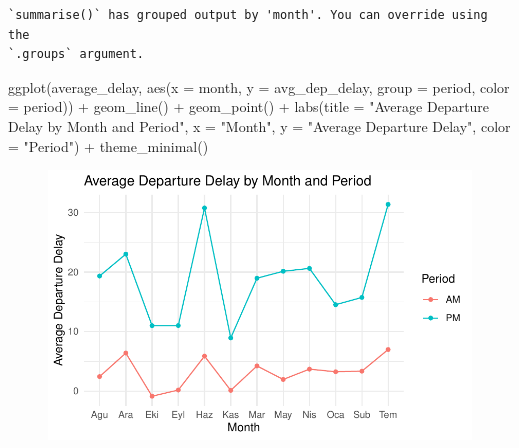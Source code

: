 \documentclass[
  letterpaper,
  DIV=11,
  numbers=noendperiod]{scrartcl}
\newenvironment{Shaded}{\begin{snugshade}}{\end{snugshade}}
\newcommand{\AttributeTok}[1]{\textcolor[rgb]{0.40,0.45,0.13}{#1}}
\newcommand{\FunctionTok}[1]{\textcolor[rgb]{0.28,0.35,0.67}{#1}}
\newcommand{\NormalTok}[1]{\textcolor[rgb]{0.00,0.23,0.31}{#1}}
\newcommand{\SpecialCharTok}[1]{\textcolor[rgb]{0.37,0.37,0.37}{#1}}
\newcommand{\StringTok}[1]{\textcolor[rgb]{0.13,0.47,0.30}{#1}}
\begin{document}
\begin{verbatim}
`summarise()` has grouped output by 'month'. You can override using the
`.groups` argument.
\end{verbatim}

\begin{Shaded}
\begin{Highlighting}[]
\FunctionTok{ggplot}\NormalTok{(average\_delay, }\FunctionTok{aes}\NormalTok{(}\AttributeTok{x =}\NormalTok{ month, }\AttributeTok{y =}\NormalTok{ avg\_dep\_delay, }\AttributeTok{group =}\NormalTok{ period, }\AttributeTok{color =}\NormalTok{ period)) }\SpecialCharTok{+}
  \FunctionTok{geom\_line}\NormalTok{() }\SpecialCharTok{+}
  \FunctionTok{geom\_point}\NormalTok{() }\SpecialCharTok{+}
  \FunctionTok{labs}\NormalTok{(}\AttributeTok{title =} \StringTok{"Average Departure Delay by Month and Period"}\NormalTok{,}
       \AttributeTok{x =} \StringTok{"Month"}\NormalTok{,}
       \AttributeTok{y =} \StringTok{"Average Departure Delay"}\NormalTok{,}
       \AttributeTok{color =} \StringTok{"Period"}\NormalTok{) }\SpecialCharTok{+}
  \FunctionTok{theme\_minimal}\NormalTok{() }
\end{Highlighting}
\end{Shaded}

\begin{figure}[H]

{\centering \includegraphics{STAT570_HW2_Date_Time_Components_files/figure-pdf/unnamed-chunk-11-1.pdf}

}

\end{figure}
\end{document}

